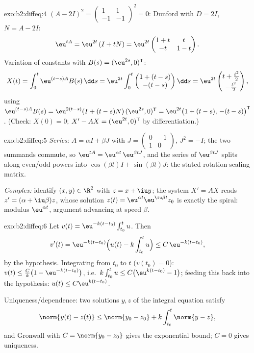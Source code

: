 \begin{solution}{exo:b2:diffeq:4}
$(A - 2I)^2 = \begin{pmatrix}1 & 1\\ -1 & -1\end{pmatrix}^2 = 0$:
Dunford with $D = 2I$, $N = A - 2I$:
\[
\eu^{tA} = \eu^{2t}\,(I + tN)
= \eu^{2t}\begin{pmatrix} 1 + t & t\\ -t & 1 - t\end{pmatrix}.
\]
Variation of constants with $B(s) = (\eu^{2s}, 0)^{\mathsf T}$:
\[
X(t) = \int_0^t \eu^{(t-s)A}B(s)\,\dd s
= \eu^{2t}\int_0^t \begin{pmatrix} 1 + (t-s)\\ -(t-s)
\end{pmatrix}\dd s
= \eu^{2t}\begin{pmatrix} t + \frac{t^2}{2}\\[2pt] -\frac{t^2}{2}
\end{pmatrix},
\]
using $\eu^{(t-s)A}B(s) = \eu^{2(t-s)}(I + (t-s)N)\,(\eu^{2s},
0)^{\mathsf T} = \eu^{2t}\bigl(1 + (t-s),\, -(t-s)\bigr)^{\mathsf
T}$. (Check: $X(0) = 0$; $X' - AX = (\eu^{2t}, 0)^{\mathsf T}$
by differentiation.)
\end{solution}

\begin{solution}{exo:b2:diffeq:5}
\emph{Series:} $A = \alpha I + \beta J$ with $J =
\begin{pmatrix}0 & -1\\ 1 & 0\end{pmatrix}$, $J^2 = -I$; the two
summands commute, so $\eu^{tA} = \eu^{\alpha t}\,\eu^{\beta tJ}$,
and the series of $\eu^{\beta t J}$ splits along even/odd powers
into $\cos(\beta t)I + \sin(\beta t)J$: the stated rotation-scaling
matrix.

\emph{Complex:} identify $(x, y) \in \R^2$ with $z = x + \iu y$;
the system $X' = AX$ reads $z' = (\alpha + \iu\beta)z$, whose
solution $z(t) = \eu^{\alpha t}\eu^{\iu\beta t}z_0$ is exactly the
spiral: modulus $\eu^{\alpha t}$, argument advancing at speed
$\beta$.
\end{solution}

\begin{solution}{exo:b2:diffeq:6}
Let $v(t) = \eu^{-k(t - t_0)}\int_{t_0}^t u$. Then
\[
v'(t) = \eu^{-k(t-t_0)}\Bigl(u(t) - k\int_{t_0}^t u\Bigr)
\leq C\,\eu^{-k(t-t_0)},
\]
by the hypothesis. Integrating from $t_0$ to $t$ ($v(t_0) = 0$):
$v(t) \leq \frac{C}{k}\bigl(1 - \eu^{-k(t - t_0)}\bigr)$, i.e.\
$k\int_{t_0}^t u \leq C\bigl(\eu^{k(t-t_0)} - 1\bigr)$; feeding
this back into the hypothesis: $u(t) \leq C\eu^{k(t-t_0)}$.

Uniqueness/dependence: two solutions $y, z$ of the integral
equation satisfy
\[
\norm{y(t) - z(t)} \leq \norm{y_0 - z_0} +
k\int_{t_0}^{t}\norm{y - z},
\]
and Gronwall with $C = \norm{y_0 - z_0}$ gives the exponential
bound; $C = 0$ gives uniqueness.
\end{solution}

